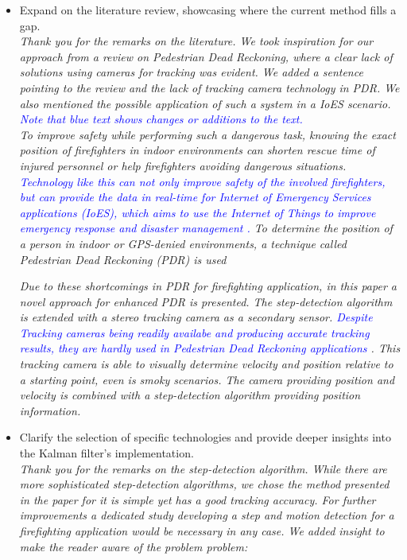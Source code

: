 \documentclass{article}
\begin{document}
\begin{itemize}
\item Expand on the literature review, showcasing where the current method fills a gap.\\
\textit{Thank you for the remarks on the literature. We took inspiration for our approach from a review on Pedestrian Dead Reckoning, where a clear lack of solutions using cameras for tracking was evident. We added a sentence pointing to the review and the lack of tracking camera technology in PDR. We also mentioned the possible application of such a system in a IoES scenario. \textcolor{blue}{Note that blue text shows changes or additions to the text.}}\\

\textit{To improve safety while performing such a dangerous task, knowing the exact position of firefighters in indoor environments can shorten rescue time of injured personnel or help firefighters avoiding dangerous situations. \textcolor{blue}{Technology like this can not only improve safety of the involved firefighters, but can provide the data in real-time for  Internet of Emergency Services applications (IoES), which aims to use the Internet of Things to improve emergency response and disaster management \cite{damasevcius2023}.} To determine the position of a person in indoor or GPS-denied environments, a technique called Pedestrian Dead Reckoning (PDR) is used}




\textit{Due to these shortcomings in PDR for firefighting application, in this paper  a novel approach for enhanced PDR is presented. The step-detection algorithm is extended with a stereo tracking camera as a secondary sensor. \textcolor{blue}{Despite Tracking cameras being readily availabe and producing accurate tracking results, they are hardly used in Pedestrian Dead Reckoning applications \cite{hou2021}}. This tracking camera is able to visually determine velocity and position relative to a starting point, even is smoky scenarios. The camera providing position and velocity is combined with a step-detection algorithm providing position information.}

\item Clarify the selection of specific technologies and provide deeper insights into the Kalman filter's implementation.\\
\textit{Thank you for the remarks on the step-detection algorithm. While there are more sophisticated step-detection algorithms, we chose the method presented in the paper for it is simple yet has a good tracking accuracy. For further improvements a dedicated study developing a step and motion detection for a firefighting application would be necessary in any case. We added insight to make the reader aware of the problem problem:}


\end{itemize}
\end{document}
